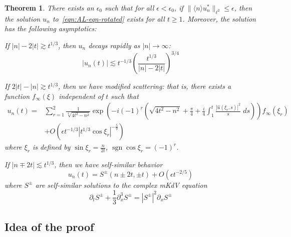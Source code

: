 \documentclass[letterpaper, reqno,final]{amsart}
\DeclareMathOperator{\sgn}{sgn}
\newcommand{\jBra}[1]{\langle #1 \rangle}
\newtheorem{thm}{Theorem}
\begin{document}
\begin{thm}\label{thm:main-thm-AL}
	There exists an $\epsilon_0$ such that for all $\epsilon < \epsilon_0$, if $\lVert \jBra{n} u^*_n \rVert_{\ell^2} \leq \epsilon$, then the solution $u_n$ to~\eqref{eqn:AL-eqn-rotated} exists for all $t \geq 1$.  Moreover, the solution has the following asymptotics:
	
	If $|n| - 2|t| \gtrsim t^{1/3}$, then $u_n$ decays rapidly as $|n| \to \infty$:
	\begin{equation}\label{eqn:main-thm-al-decay-rgn}
	    |u_n(t)| \lesssim t^{-1/3} \left(\frac{t^{1/3}}{|n| - 2|t|}\right)^{3/4}
	\end{equation}
		
	If $2|t| - |n| \gtrsim t^{1/3}$, then we have modified scattering:  that is, there exists a function $f_\infty(\xi)$ independent of $t$ such that
	\begin{equation}\label{eqn:main-thm-al-osc-rgn}\begin{split}
	    u_n(t) =& \sum_{r=1}^2 \frac{1}{\sqrt[4]{4t^2 - n^2}} \exp\left(-i(-1)^r\left( \sqrt{4t^2 - n^2} + \frac{\pi}{4} + \frac{i}{4} \int_1^t \frac{|\hat{u}(\xi_r,s)|^2}{s}\;ds\right)\right) f_\infty(\xi_r)\\ &+ O\left(\epsilon t^{-1/3} |t^{1/3}\cos \xi_r|^{-\frac{5}{9}}\right)
	\end{split}\end{equation}
	where $\xi_r$ is defined by $\sin \xi_r = \frac{n}{2t}$, $\sgn \cos \xi_r = (-1)^r$.
	
	If $|n \mp 2t| \lesssim t^{1/3}$, then we have self-similar behavior
	\begin{equation}\label{eqn:main-thm-al-ss-rgn}
	    u_n(t) = S^\pm(n \pm 2t, \pm t) + O(\epsilon t^{-2/5})
	\end{equation}
	where $S^\pm$ are self-similar solutions to the complex mKdV equation
	\begin{equation}\label{eqn:cmkdv}
	    \partial_t S^\pm + \frac{1}{3} \partial_x^3 S^\pm = |S^\pm|^2 \partial_x S^\pm
	\end{equation}
\end{thm}
		
	
\subsection{Idea of the proof}
\end{document}
